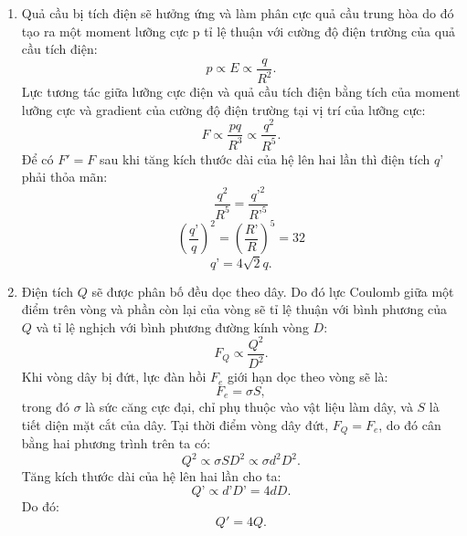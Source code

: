 \begin{vd}
\begin{enumerate}[1)]
\begin{center}
        \end{center}
    \end{enumerate}

\end{vd}
\begin{loigiai}
    \begin{enumerate}[1)]
        \item Quả cầu bị tích điện sẽ hưởng ứng và làm phân cực quả cầu trung hòa do đó tạo ra một moment lưỡng cực p tỉ lệ thuận với cường độ điện trường của quả cầu tích điện:
        $$p \propto E \propto \dfrac{q}{R^2}.$$
        Lực tương tác giữa lưỡng cực điện và quả cầu tích điện bằng tích của moment lưỡng cực và gradient của cường độ điện trường tại vị trí của lưỡng cực:
       $$F \propto \dfrac{pq}{R^3} \propto \dfrac{q^2}{R^5}.$$
       Để có $F'=F$ sau khi tăng kích thước dài của hệ lên hai lần thì điện tích $q’$ phải thỏa mãn:
       $$\dfrac{q^2}{R^5} = \dfrac{q’^2}{R’^5}$$
       $$\left(\dfrac{q’}{q}\right)^2 = \left(\dfrac{R’}{R}\right)^5 = 32$$
       $$q’ = 4\sqrt{2} q.$$
       \item Điện tích $Q$ sẽ được phân bố đều dọc theo dây. Do đó lực Coulomb giữa một điểm trên vòng và phần còn lại của vòng sẽ tỉ lệ thuận với bình phương của $Q$ và tỉ lệ nghịch với bình phương đường kính vòng $D$:
       $$F_Q \propto \dfrac{Q^2}{D^2}.$$
       Khi vòng dây bị đứt, lực đàn hồi $F_e$ giới hạn dọc theo vòng sẽ là:
        $$F_e = \sigma S,$$
        trong đó $\sigma$ là sức căng cực đại, chỉ phụ thuộc vào vật liệu làm dây, và $S$ là tiết diện mặt cắt của dây. Tại thời điểm vòng dây đứt, $F_Q=F_e$, do đó cân bằng hai phương trình trên ta có:
        $$Q^2 \propto \sigma SD^2 \propto \sigma d^2D^2.$$
        Tăng kích thước dài của hệ lên hai lần cho ta:
         $$Q’ \propto d’D’ = 4dD.$$
         Do đó:
        $$Q' = 4Q.$$
    \end{enumerate}
\end{loigiai}



